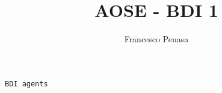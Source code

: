 \documentclass[11pt]{article}
\begin{document}
\author{Francesco Penasa}
\title{AOSE - BDI 1}
\maketitle

\medskip

\texttt{BDI agents}
\end{document}
